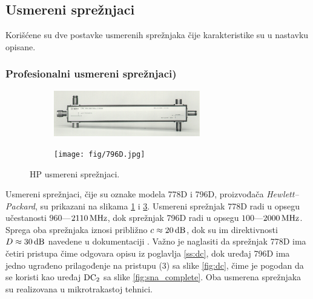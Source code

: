 \documentclass[a4paper, 12pt, diplomski]{etf}
\renewcommand{\unit}[1]{\,{\rm #1}}   %
\begin{document}
\subsection{Usmereni sprežnjaci}
Korišćene su dve postavke usmerenih sprežnjaka čije 
karakteristike su u nastavku opisane.

\subsubsection{Profesionalni usmereni sprežnjaci)
\label{ss:hp}}
\begin{figure}[b!]
    \hfill
    \begin{subfigure}[b]{0.49\textwidth}
        \centering
        \includegraphics[angle=90, width=0.7\textwidth]{fig/778D.jpg}
        \label{fig:778d}
    \end{subfigure}
    \hfill
    \begin{subfigure}[b]{0.49\textwidth}
        \centering
        \texttt{[image: fig/796D.jpg]}
        \label{fig:796d}
    \end{subfigure}
    \hfill
    \caption{HP usmereni sprežnjaci.}
\end{figure}

Usmereni sprežnjaci, čije su oznake modela 778D i 796D,
proizvođača \textit{Hewlett--Packard},
su prikazani na slikama \ref{fig:778d} i \ref{fig:796d}.
Usmereni sprežnjak 778D
radi u opsegu učestanosti $960$---$2110\unit{MHz}$, dok 
sprežnjak 796D radi u opsegu  $100$---$2000\unit{MHz}$.
Sprega oba sprežnjaka iznosi približno $c \approx 
20\unit{dB}$, dok su im direktivnosti 
$D \approx 30\unit{dB}$ navedene u dokumentaciji
\cite{datasheet778d, datasheet796d}. 
Važno je naglasiti da sprežnjak 778D
ima četiri pristupa čime odgovara opisu 
iz poglavlja \ref{ss:dc}, dok uređaj 796D
ima jedno ugrađeno prilagođenje na pristupu 
(3) sa slike \ref{fig:dc}, čime je pogodan
da se koristi kao uređaj $\rm DC_2$ sa slike
\ref{fig:sna_complete}.
Oba usmerena sprežnjaka su realizovana u 
mikrotrakastoj tehnici. 

%
\end{document}
